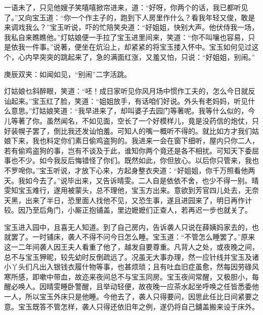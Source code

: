 \begin{parag}
    一语未了，只见他嫂子笑嘻嘻掀帘进来，道：“好呀，你两个的话，我已都听见了。”又向宝玉道：“你一个作主子的，跑到下人房里作什么？看我年轻又俊，敢是来调戏我么？”宝玉听说，吓的忙陪笑央道：“好姐姐，快别大声。他伏侍我一场，我私自来瞧瞧他。”灯姑娘便一手拉了宝玉进里间来，笑道：“你不叫嚷也容易，只是依我一件事。”说著，便坐在炕沿上，却紧紧的将宝玉搂入怀中。宝玉如何见过这个，心内早突突的跳起来了，急的满面红涨，又羞又怕，只说：“好姐姐，别闹。”\begin{note}庚辰双夹：如闻如见，“别闹”二字活跳。\end{note}灯姑娘乜斜醉眼，笑道：“呸！成日家听见你风月场中惯作工夫的，怎么今日就反讪起来。”宝玉红了脸，笑道：“姐姐放手，有话咱们好说。外头有老妈妈，听见什么意思。”灯姑娘笑道：“我早进来了，却叫婆子去园门等著呢。我等什么似的，今儿等著了你。虽然闻名，不如见面，空长了一个好模样儿，竟是没药信的炮仗，只好装幌子罢了，倒比我还发讪怕羞。可知人的嘴一概听不得的。就比如方才我们姑娘下来，我也料定你们素日偷鸡盗狗的。我进来一会在窗下细听，屋内只你二人，若有偷鸡盗狗的事，岂有不谈及于此，谁知你两个竟还是各不相扰。可知天下委屈事也不少。如今我反后悔错怪了你们。既然如此，你但放心。以后你只管来，我也不罗唣你。”宝玉听说，才放下心来，方起身整衣央道：“好姐姐，你千万照看他两天。我如今去了。”说毕出来，又告诉晴雯。二人自是依依不舍，也少不得一别。晴雯知宝玉难行，遂用被蒙头，总不理他，宝玉方出来。意欲到芳官四儿处去，无奈天黑，出来了半日，恐里面人找他不见，又恐生事，遂且进园来了，明日再作计较。因乃至后角门，小厮正抱铺盖，里边嬷嬷们正查人，若再迟一步也就关了。
\end{parag}


\begin{parag}
    宝玉进入园中，且喜无人知道。到了自己房内，告诉袭人只说在薛姨妈家去的，也就罢了。一时铺床，袭人不得不问今日怎么睡。宝玉道：“不管怎么睡罢了。”原来这一二年间袭人因王夫人看重了他了，越发自要尊重。凡背人之处，或夜晚之间，总不与宝玉狎昵，较先幼时反倒疏远了。况虽无大事办理，然一应针线并宝玉及诸小丫头们凡出入银钱衣履什物等事，也甚烦琐；且有吐血旧症虽愈，然每因劳碌风寒所感，即嗽中带血，故迩来夜间总不与宝玉同房。宝玉夜间常醒，又极胆小，每醒必唤人。因晴雯睡卧警醒，且举动轻便，故夜晚一应茶水起坐呼唤之任皆悉委他一人，所以宝玉外床只是他睡。今他去了，袭人只得要问，因思此任比日间紧要之意。宝玉既答不管怎样，袭人只得还依旧年之例，遂仍将自己舖盖搬来设于床外。
\end{parag}


